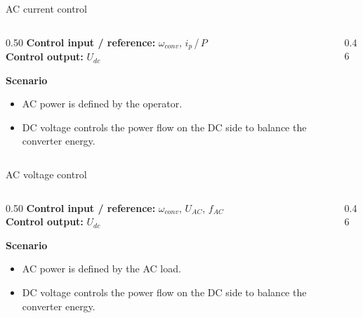 \begin{frame}{AC current control}
  \begin{columns}[c,onlytextwidth]
    \begin{column}{0.50\textwidth}
      \textbf{Control input / reference:} $\omega_{conv}$, $i_p$\,/\,$P$\\[0.4em]
      \textbf{Control output:} $U_{dc}$
      \vspace{0.6em}

      \textbf{Scenario}
      \begin{itemize}
        \setlength{\itemsep}{0.3em}
        \item AC power is defined by the operator.
        \item DC voltage controls the power flow on the DC side to balance
              the converter energy.
      \end{itemize}
    \end{column}
    \begin{column}{0.46\textwidth}
      \centering
    \end{column}
  \end{columns}
\end{frame}

\begin{frame}{AC voltage control}
  \begin{columns}[c,onlytextwidth]
    \begin{column}{0.50\textwidth}
      \textbf{Control input / reference:} $\omega_{conv}$, $U_{AC}$, $f_{AC}$\\[0.4em]
      \textbf{Control output:} $U_{dc}$
      \vspace{0.6em}

      \textbf{Scenario}
      \begin{itemize}
        \setlength{\itemsep}{0.3em}
        \item AC power is defined by the AC load.
        \item DC voltage controls the power flow on the DC side to balance
              the converter energy.
      \end{itemize}
    \end{column}
    \begin{column}{0.46\textwidth}
      \centering
    \end{column}
  \end{columns}
\end{frame}


